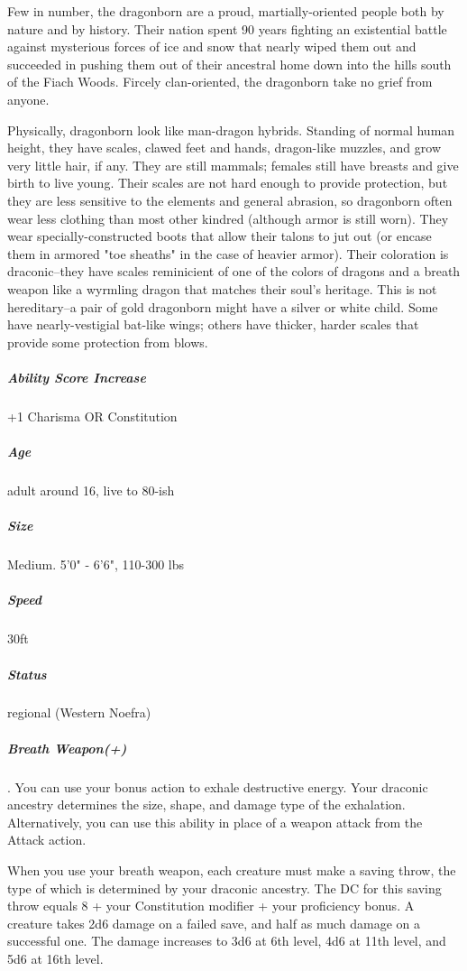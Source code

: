 Few in number, the dragonborn are a proud, martially-oriented people both by nature and by history. Their nation spent 90 years fighting an existential battle against mysterious forces of ice and snow that nearly wiped them out and succeeded in pushing them out of their ancestral home down into the hills south of the Fiach Woods. Fircely clan-oriented, the dragonborn take no grief from anyone.

Physically, dragonborn look like man-dragon hybrids. Standing of normal human height, they have scales, clawed feet and hands, dragon-like muzzles, and grow very little hair, if any. They are still mammals; females still have breasts and give birth to live young. Their scales are not hard enough to provide protection, but they are less sensitive to the elements and general abrasion, so dragonborn often wear less clothing than most other kindred (although armor is still worn). They wear specially-constructed boots that allow their talons to jut out (or encase them in armored "toe sheaths" in the case of heavier armor). Their coloration is draconic--they have scales reminicient of one of the colors of dragons and a breath weapon like a wyrmling dragon that matches their soul's heritage. This is not hereditary--a pair of gold dragonborn might have a silver or white child. Some have nearly-vestigial bat-like wings; others have thicker, harder scales that provide some protection from blows.

\subparagraph*{Ability Score Increase}  +1 Charisma OR Constitution

\subparagraph*{Age}  adult around 16, live to 80-ish

\subparagraph*{Size}  Medium. 5'0" - 6'6", 110-300 lbs

\subparagraph*{Speed}  30ft

\subparagraph*{Status}  regional (Western Noefra)

\subparagraph*{Breath Weapon(+)}. You can use your bonus action to exhale destructive energy. Your draconic ancestry determines the size, shape, and damage type of the exhalation. Alternatively, you can use this ability in place of a weapon attack from the Attack action.

When you use your breath weapon, each creature must make a saving throw, the type of which is determined by your draconic ancestry. The DC for this saving throw equals 8 + your Constitution modifier + your proficiency bonus. A creature takes 2d6 damage on a failed save, and half as much damage on a successful one. The damage increases to 3d6 at 6th level, 4d6 at 11th level, and 5d6 at 16th level.

